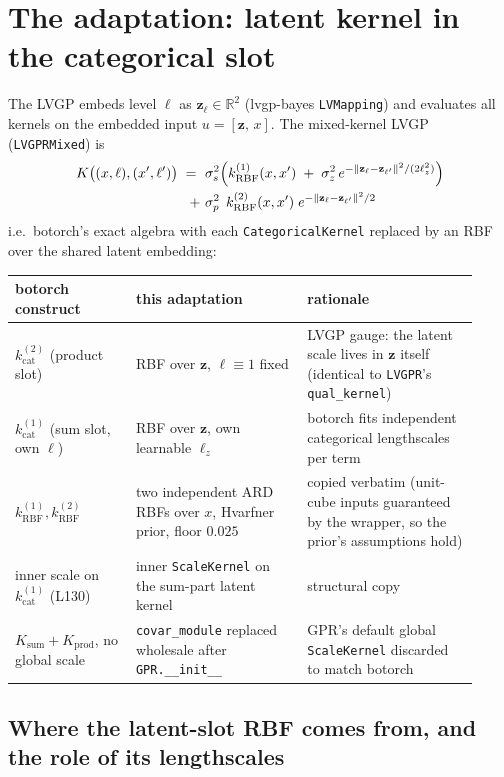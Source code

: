 \documentclass[11pt]{article}
\begin{document}
\section{The adaptation: latent kernel in the categorical slot}

The LVGP embeds level $\ell$ as $\mathbf z_\ell \in \mathbb R^2$ (lvgp-bayes
\texttt{LVMapping}) and evaluates all kernels on the embedded input
$u = [\mathbf z,\, x]$. The mixed-kernel LVGP (\texttt{LVGPRMixed}) is
\begin{align}
K\big((x,\ell),(x',\ell')\big) \;=\;
  &\ \sigma_s^2\Big( k_{\mathrm{RBF}}^{(1)}(x,x')
   \;+\; \sigma_z^2\, e^{-\|\mathbf z_\ell-\mathbf z_{\ell'}\|^2 / (2\ell_z^2)} \Big) \notag\\
 +&\ \sigma_p^2\;\, k_{\mathrm{RBF}}^{(2)}(x,x')\;
   e^{-\|\mathbf z_\ell-\mathbf z_{\ell'}\|^2 / 2}
\label{eq:mixedlvgp}
\end{align}
i.e.\ botorch's exact algebra with each \texttt{CategoricalKernel} replaced by an RBF over the
shared latent embedding:
\begin{center}
\small
\begin{tabular}{p{0.24\linewidth}p{0.34\linewidth}p{0.34\linewidth}}
\toprule
botorch construct & this adaptation & rationale \\
\midrule
$k_{\mathrm{cat}}^{(2)}$ (product slot) & RBF over $\mathbf z$, $\ell \equiv 1$ fixed &
LVGP gauge: the latent scale lives in $\mathbf z$ itself (identical to \texttt{LVGPR}'s
\texttt{qual\_kernel}) \\[3pt]
$k_{\mathrm{cat}}^{(1)}$ (sum slot, own $\ell$) & RBF over $\mathbf z$, own learnable
$\ell_z$ & botorch fits independent categorical lengthscales per term \\[3pt]
$k_{\mathrm{RBF}}^{(1)}, k_{\mathrm{RBF}}^{(2)}$ & two independent ARD RBFs over $x$,
Hvarfner prior, floor $0.025$ & copied verbatim (unit-cube inputs guaranteed by the wrapper,
so the prior's assumptions hold) \\[3pt]
inner scale on $k_{\mathrm{cat}}^{(1)}$ (L130) & inner \texttt{ScaleKernel} on the sum-part
latent kernel & structural copy \\[3pt]
$K_{\mathrm{sum}}+K_{\mathrm{prod}}$, no global scale & \texttt{covar\_module} replaced
wholesale after \texttt{GPR.\_\_init\_\_} & GPR's default global \texttt{ScaleKernel}
discarded to match botorch \\
\bottomrule
\end{tabular}
\end{center}
\subsection*{Where the latent-slot RBF comes from, and the role of its lengthscales}
\end{document}
